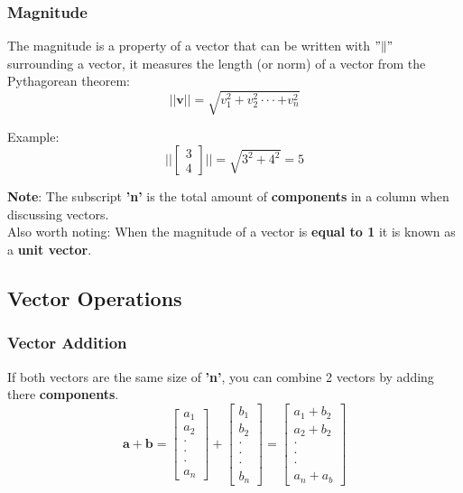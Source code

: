 \documentclass[12pt]{article}
\begin{document}
        \subsubsection{Magnitude}
            The magnitude is a property of a vector that can be written with $"\|"$ surrounding a vector, it measures the length (or norm) of a vector from the Pythagorean theorem:
            \begin{equation}
                ||\mathbf{v}|| = \sqrt{v^2_1 + v^2_2 \cdot\cdot\cdot + v^2_n}
            \end{equation}

            Example:
            \begin{equation}
                ||\begin{bmatrix} 3 \\ 4 \end{bmatrix}|| = \sqrt{3^2 + 4^2} = 5
            \end{equation}

            \textbf{Note}: The subscript \textbf{'n'} is the total amount of \textbf{components} in a column when discussing vectors. \\
            Also worth noting: When the magnitude of a vector is \textbf{equal to 1} it is known as a \textbf{unit vector}.

    \subsection{Vector Operations}
        \subsubsection{Vector Addition}
            If both vectors are the same size of \textbf{'n'}, you can combine 2 vectors by adding there \textbf{components}.
            \begin{equation}
                \mathbf{a + b} =
                    \begin{bmatrix} a_1 \\ a_2 \\ \cdot \\ \cdot \\ \cdot \\ a_n \end{bmatrix} +
                    \begin{bmatrix} b_1 \\ b_2 \\ \cdot \\ \cdot \\ \cdot \\ b_n \end{bmatrix} =
                    \begin{bmatrix} a_1 + b_2 \\ a_2 + b_2 \\ \cdot \\ \cdot \\ \cdot \\ a_n + a_b \end{bmatrix}
            \end{equation}
\end{document}
